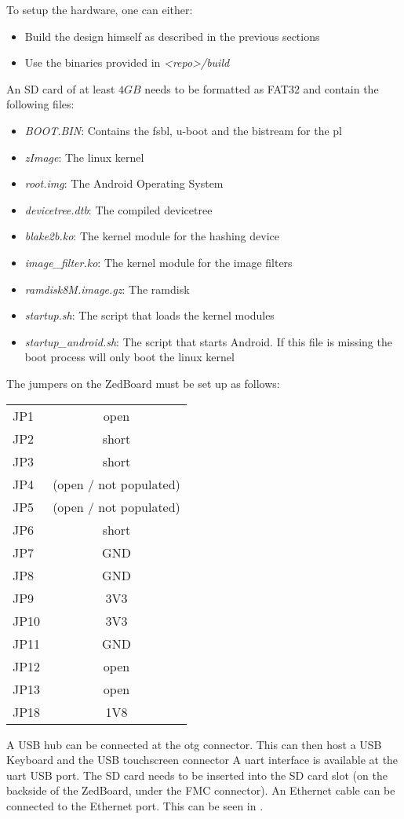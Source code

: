 To setup the hardware, one can either:
\begin{itemize}
	\item Build the design himself as described in the previous sections
	\item Use the binaries provided in \emph{<repo>/build}
\end{itemize}
An SD card of at least $4GB$ needs to be formatted as FAT32 and contain the
following files:
\begin{itemize}
	\item \emph{BOOT.BIN}: Contains the \gls{fsbl}, u-boot and the bistream
		for the \gls{pl}
	\item \emph{zImage}: The linux kernel
	\item \emph{root.img}: The Android Operating System
	\item \emph{devicetree.dtb}: The compiled devicetree
	\item \emph{blake2b.ko}: The kernel module for the hashing device
	\item \emph{image\_filter.ko}: The kernel module for the image filters
	\item \emph{ramdisk8M.image.gz}: The ramdisk
	\item \emph{startup.sh}: The script that loads the kernel modules
	\item \emph{startup\_android.sh}: The script that starts Android. If this
		file is missing the boot process will only boot the linux kernel
\end{itemize}
The jumpers on the ZedBoard must be set up as follows:

\begin{center}
	\begin{tabular}{lc}
		JP1 & open\\
		JP2 & short\\
		JP3 & short\\
		JP4 & (open / not populated)\\
		JP5 & (open / not populated)\\
		JP6 & short\\
		JP7 & GND\\
		JP8 & GND\\
		JP9 & 3V3\\
		JP10 & 3V3\\
		JP11 & GND\\
		JP12 & open\\
		JP13 & open\\
		JP18 & 1V8\\
	\end{tabular}
\end{center}
A USB hub can be connected at the \gls{otg} connector.
This can then host a USB Keyboard and the USB touchscreen connector
A \gls{uart} interface is available at the \gls{uart} USB port.
The SD card needs to be inserted into the SD card slot (on the backside of
the ZedBoard, under the FMC connector).
An Ethernet cable can be connected to the Ethernet port.
This can be seen in .

